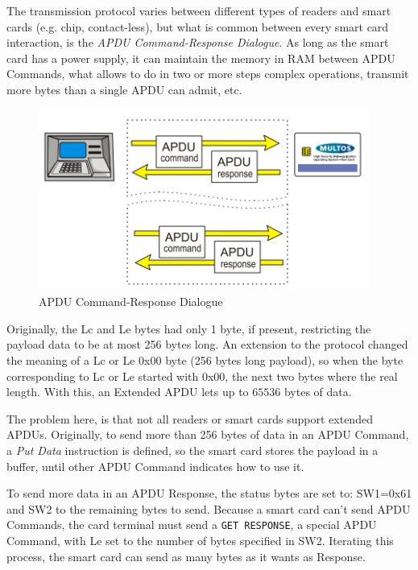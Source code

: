 \hfil


The transmission protocol varies between different types of readers and smart cards (e.g. chip, contact-less), but what is common between every smart card interaction, is the \textit{APDU Command-Response Dialogue}. As long as the smart card has a power supply, it can maintain the memory in RAM between APDU Commands, what allows to do in two or more steps complex operations, transmit more bytes than a single APDU can admit, etc.

\hfil




\begin{figure}[bth]
	\begin{center}
		\includegraphics[width=0.75\linewidth]{gfx/APDUdialog}
	\end{center}
	\caption{APDU Command-Response Dialogue}
	\label{fig:APDUdialog}
\end{figure}

Originally, the Lc and Le bytes had only 1 byte, if present, restricting the payload data to be at most 256 bytes long. An extension to the protocol changed the meaning of a Lc or Le 0x00 byte (256 bytes long payload), so when the byte corresponding to Lc or Le started with 0x00, the next two bytes where the real length.  With this, an Extended APDU lets up to $65536$ bytes of data.

The problem here, is that not all readers or smart cards support extended APDUs. Originally, to send more than 256 bytes of data in an APDU Command, a \textit{Put Data} instruction is defined, so the smart card stores the payload in a buffer, until other APDU Command indicates how to use it.

To send more data in an APDU Response, the status bytes are set to: SW1=0x61 and SW2 to the remaining bytes to send. Because a smart card can't send APDU Commands, the card terminal must send a \texttt{GET RESPONSE}, a special APDU Command, with Le set to the number of bytes specified in SW2. Iterating this process, the smart card can send as many bytes as it wants as Response.

